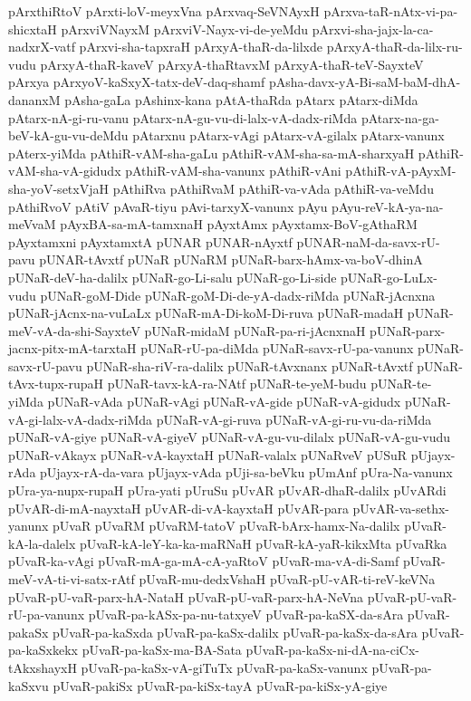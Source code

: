 {pArxthiRtoV
pArxti-loV-meyxVna
pArxvaq-SeVNAyxH
pArxva-taR-nAtx-vi-pa-shicxtaH
pArxviVNayxM
pArxviV-Nayx-vi-de-yeMdu
pArxvi-sha-jajx-la-ca-nadxrX-vatf
pArxvi-sha-tapxraH
pArxyA-thaR-da-lilxde
pArxyA-thaR-da-lilx-ru-vudu
pArxyA-thaR-kaveV
pArxyA-thaRtavxM
pArxyA-thaR-teV-SayxteV
pArxya
pArxyoV-kaSxyX-tatx-deV-daq-shamf
pAsha-davx-yA-Bi-saM-baM-dhA-dananxM
pAsha-gaLa
pAshinx-kana
pAtA-thaRda
pAtarx
pAtarx-diMda
pAtarx-nA-gi-ru-vanu
pAtarx-nA-gu-vu-di-lalx-vA-dadx-riMda
pAtarx-na-ga-beV-kA-gu-vu-deMdu
pAtarxnu
pAtarx-vAgi
pAtarx-vA-gilalx
pAtarx-vanunx
pAterx-yiMda
pAthiR-vAM-sha-gaLu
pAthiR-vAM-sha-sa-mA-sharxyaH
pAthiR-vAM-sha-vA-gidudx
pAthiR-vAM-sha-vanunx
pAthiR-vAni
pAthiR-vA-pAyxM-sha-yoV-setxVjaH
pAthiRva
pAthiRvaM
pAthiR-va-vAda
pAthiR-va-veMdu
pAthiRvoV
pAtiV
pAvaR-tiyu
pAvi-tarxyX-vanunx
pAyu
pAyu-reV-kA-ya-na-meVvaM
pAyxBA-sa-mA-tamxnaH
pAyxtAmx
pAyxtamx-BoV-gAthaRM
pAyxtamxni
pAyxtamxtA
pUNAR
pUNAR-nAyxtf
pUNAR-naM-da-savx-rU-pavu
pUNAR-tAvxtf
pUNaR
pUNaRM
pUNaR-barx-hAmx-va-boV-dhinA
pUNaR-deV-ha-dalilx
pUNaR-go-Li-salu
pUNaR-go-Li-side
pUNaR-go-LuLx-vudu
pUNaR-goM-Dide
pUNaR-goM-Di-de-yA-dadx-riMda
pUNaR-jAcnxna
pUNaR-jAcnx-na-vuLaLx
pUNaR-mA-Di-koM-Di-ruva
pUNaR-madaH
pUNaR-meV-vA-da-shi-SayxteV
pUNaR-midaM
pUNaR-pa-ri-jAcnxnaH
pUNaR-parx-jacnx-pitx-mA-tarxtaH
pUNaR-rU-pa-diMda
pUNaR-savx-rU-pa-vanunx
pUNaR-savx-rU-pavu
pUNaR-sha-riV-ra-dalilx
pUNaR-tAvxnanx
pUNaR-tAvxtf
pUNaR-tAvx-tupx-rupaH
pUNaR-tavx-kA-ra-NAtf
pUNaR-te-yeM-budu
pUNaR-te-yiMda
pUNaR-vAda
pUNaR-vAgi
pUNaR-vA-gide
pUNaR-vA-gidudx
pUNaR-vA-gi-lalx-vA-dadx-riMda
pUNaR-vA-gi-ruva
pUNaR-vA-gi-ru-vu-da-riMda
pUNaR-vA-giye
pUNaR-vA-giyeV
pUNaR-vA-gu-vu-dilalx
pUNaR-vA-gu-vudu
pUNaR-vAkayx
pUNaR-vA-kayxtaH
pUNaR-valalx
pUNaRveV
pUSuR
pUjayx-rAda
pUjayx-rA-da-vara
pUjayx-vAda
pUji-sa-beVku
pUmAnf
pUra-Na-vanunx
pUra-ya-nupx-rupaH
pUra-yati
pUruSu
pUvAR
pUvAR-dhaR-dalilx
pUvARdi
pUvAR-di-mA-nayxtaH
pUvAR-di-vA-kayxtaH
pUvAR-para
pUvAR-va-sethx-yanunx
pUvaR
pUvaRM
pUvaRM-tatoV
pUvaR-bArx-hamx-Na-dalilx
pUvaR-kA-la-dalelx
pUvaR-kA-leY-ka-ka-maRNaH
pUvaR-kA-yaR-kikxMta
pUvaRka
pUvaR-ka-vAgi
pUvaR-mA-ga-mA-cA-yaRtoV
pUvaR-ma-vA-di-Samf
pUvaR-meV-vA-ti-vi-satx-rAtf
pUvaR-mu-dedxVshaH
pUvaR-pU-vAR-ti-reV-keVNa
pUvaR-pU-vaR-parx-hA-NataH
pUvaR-pU-vaR-parx-hA-NeVna
pUvaR-pU-vaR-rU-pa-vanunx
pUvaR-pa-kASx-pa-nu-tatxyeV
pUvaR-pa-kaSX-da-sAra
pUvaR-pakaSx
pUvaR-pa-kaSxda
pUvaR-pa-kaSx-dalilx
pUvaR-pa-kaSx-da-sAra
pUvaR-pa-kaSxkekx
pUvaR-pa-kaSx-ma-BA-Sata
pUvaR-pa-kaSx-ni-dA-na-ciCx-tAkxshayxH
pUvaR-pa-kaSx-vA-giTuTx
pUvaR-pa-kaSx-vanunx
pUvaR-pa-kaSxvu
pUvaR-pakiSx
pUvaR-pa-kiSx-tayA
pUvaR-pa-kiSx-yA-giye
}

